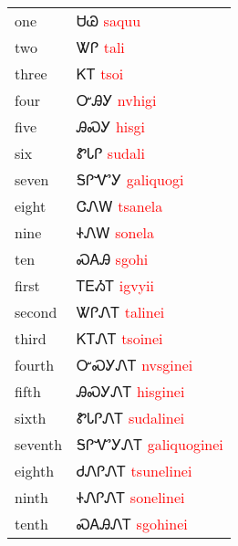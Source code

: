 \begin{minipage}{\linewidth}
\begin{tabular}{p{3cm} p{11cm}}
one & ᏌᏊ 
 \newline \textcolor{red}{saquu}\\
two & ᏔᎵ 
 \newline \textcolor{red}{tali}\\
three & ᏦᎢ 
 \newline \textcolor{red}{tsoi}\\
four & ᏅᎯᎩ 
 \newline \textcolor{red}{nvhigi}\\
five & ᎯᏍᎩ 
 \newline \textcolor{red}{hisgi}\\
six & ᏑᏓᎵ 
 \newline \textcolor{red}{sudali}\\
seven & ᎦᎵᏉᎩ 
 \newline \textcolor{red}{galiquogi}\\
eight & ᏣᏁᎳ 
 \newline \textcolor{red}{tsanela}\\
nine & ᏐᏁᎳ 
 \newline \textcolor{red}{sonela}\\
ten & ᏍᎪᎯ 
 \newline \textcolor{red}{sgohi}\\
first & ᎢᎬᏱᎢ 
 \newline \textcolor{red}{igvyii}\\
second & ᏔᎵᏁᎢ 
 \newline \textcolor{red}{talinei}\\
third & ᏦᎢᏁᎢ 
 \newline \textcolor{red}{tsoinei}\\
fourth & ᏅᏍᎩᏁᎢ 
 \newline \textcolor{red}{nvsginei}\\
fifth & ᎯᏍᎩᏁᎢ 
 \newline \textcolor{red}{hisginei}\\
sixth & ᏑᏓᎵᏁᎢ 
 \newline \textcolor{red}{sudalinei}\\
seventh & ᎦᎵᏉᎩᏁᎢ 
 \newline \textcolor{red}{galiquoginei}\\
eighth & ᏧᏁᎵᏁᎢ 
 \newline \textcolor{red}{tsunelinei}\\
ninth & ᏐᏁᎵᏁᎢ 
 \newline \textcolor{red}{sonelinei}\\
tenth & ᏍᎪᎯᏁᎢ 
 \newline \textcolor{red}{sgohinei}\\
\end{tabular}
\end{minipage}

